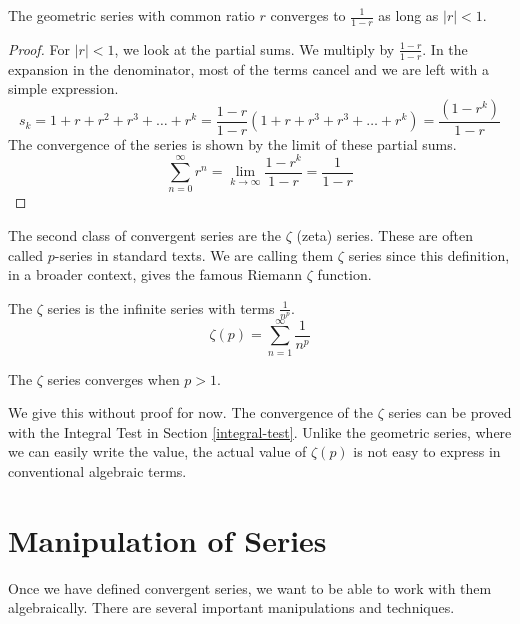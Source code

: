 \documentclass[fleqn]{report}
\begin{document}
\begin{prop}
The geometric series with common ratio $r$ converges to
$\frac{1}{1-r}$ as long as $|r|<1$.
\end{prop}

\begin{proof}
For $|r| < 1$, we look at the partial sums. We multiply by
$\frac{1-r}{1-r}$. In the expansion in the denominator, most
of the terms cancel and we are left with a simple expression.
\begin{equation*}
s_k = 1 + r + r^2 + r^3 + \ldots + r^k = \frac{1-r}{1-r}
\left( 1 + r + r^3 + r^3 + \ldots + r^k \right) = \frac{(1-r^k)}{1-r}
\end{equation*}
The convergence of the series is shown by the limit of these
partial sums.
\begin{equation*}
\sum_{n=0}^\infty r^n = \lim_{k \rightarrow \infty}
\frac{1-r^k}{1-r} = \frac{1}{1-r}
\end{equation*}
\end{proof}

The second class of convergent series are the $\zeta$ (zeta)
series. These are often called $p$-series in standard
texts. We are calling them $\zeta$ series since this
definition, in a broader context, gives the famous Riemann
$\zeta$ function. 

\begin{defn} The $\zeta$ series is the infinite series with
terms $\frac{1}{n^p}$. 
\begin{equation*}
\zeta(p) = \sum_{n=1}^\infty \frac{1}{n^p} 
\end{equation*} \end{defn}
\begin{prop}
The $\zeta$ series converges when $p > 1$. 
\end{prop} 

We give this without proof for now. The convergence of the
$\zeta$ series can be proved with the Integral Test in
Section \ref{integral-test}. Unlike the geometric series, where
we can easily write the value, the actual value of $\zeta(p)$
is not easy to express in conventional algebraic terms.

\section{Manipulation of Series}
\label{series-manipulation}

Once we have defined convergent series, we want to be able to
work with them algebraically. There are several important
manipulations and techniques. 
\end{document}
